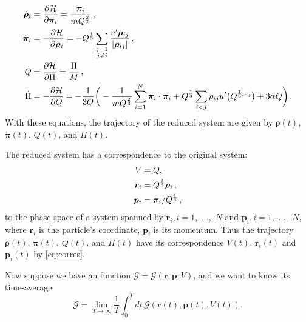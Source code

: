 \begin{align}
	\dot{ \bm{\rho} }_i & = \frac{ \partial \mathcal{H} }{ \partial \bm{\pi}_i } =
	\frac{ \bm{\pi}_i }{ m Q^{\frac{ 2 }{ 3 }} } \thinspace,                          \\
	\dot{ \bm{\pi} }_i  & = - \frac{ \partial \mathcal{H} }{ \partial \bm{\rho}_i } =
	- Q^{\frac{ 1 }{ 3 }} \sum_{\substack{j=1                                         \\j\neq i}}
	\frac{ u' \bm{\rho}_{ij} }{ \lvert \bm{\rho}_{ij} \rvert  } \thinspace,           \\
	\dot{ Q }           & = \frac{ \partial \mathcal{H} }{ \partial \Pi } =
	\frac{ \Pi }{ M } \thinspace,                                                     \\
	\dot{ \Pi }         & = - \frac{ \partial \mathcal{H} }{ \partial Q } =
	- \frac{ 1 }{ 3Q } \bigg(
	- \frac{ 1 }{ m Q^{\frac{ 2 }{ 3 }} }	\sum_{i=1}^{N} \bm{\pi}_i \cdot \bm{\pi}_i
	+ Q^{\frac{ 1 }{ 3 }} \sum_{i<j} \rho_{ij} u'\big(Q^{\frac{ 1 }{ 3 } \rho_{ij}}\big) +
	3 \alpha Q
	\bigg) \thinspace.
\end{align}
With these equations, the trajectory of the reduced system are given by
$\bm{\rho}(t)$, $\bm{\pi}(t)$, $Q(t)$, and $\Pi(t)$.

The reduced system has a correspondence to the original system:
\begin{equation}\label{eq:corres}
	\begin{split}
		V        & = Q,                                           \\
		\bm{r}_i & = Q^{\frac{ 1 }{ 3 }} \bm{\rho}_i \thinspace,  \\
		\bm{p}_i & = \bm{\pi}_i / Q^{\frac{ 1 }{ 3 }} \thinspace,
	\end{split}
\end{equation}
to the phase space of a system spanned by
$\bm{r}_i, i=1$,~$\ldots$,~$N$ and
$\bm{p}_i, i=1$,~$\ldots$,~$N$,
where $\bm{r}_i$ is the particle's coordinate, $\bm{p}_i$ is its momentum.
Thus the trajectory
$\bm{\rho}(t)$, $\bm{\pi}(t)$, $Q(t)$, and $\Pi(t)$ have its
correspondence $V(t)$, $\bm{r}_i(t)$ and $\bm{p}_i(t)$ by
\eqref{eq:corres}.

Now suppose we have an function $\mathscr{G} = \mathscr{G}(\bm{r}, \bm{p}, V)$,
and we want to know its time-average
\begin{equation}
	\overline{\mathscr{G}} =
	\lim_{T \rightarrow \infty} \frac{ 1 }{ T } \int_{0}^{T}  dt\,
	\mathscr{G}(\bm{r}(t), \bm{p}(t), V(t)).
\end{equation}

